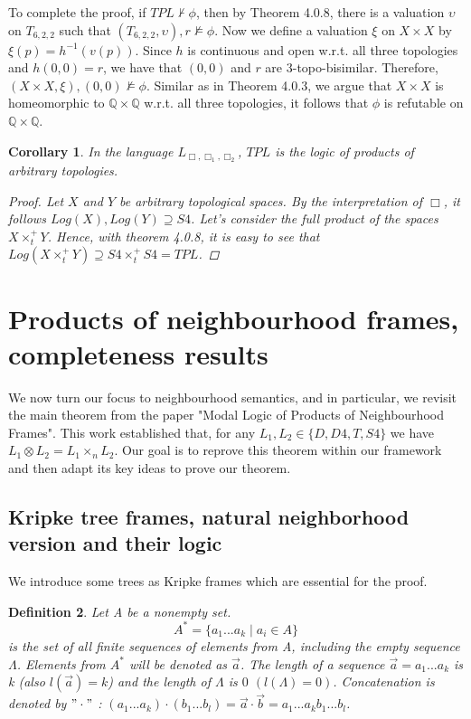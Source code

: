 \documentclass[12pt, a4paper]{scrartcl}
\newtheorem{definition}{Definition}[subsection]
\newtheorem{corollary}[definition]{Corollary}
\begin{document}
To complete the proof, if $\mathit{TPL} \nvdash \phi$, then by Theorem 4.0.8, there is a 
valuation $\upsilon$ on $T_{6,2,2}$ such that $(T_{6,2,2}, \upsilon), r \nvDash \phi$. Now we define a valuation $\xi$
on $X \times X$ by $\xi(p) = h^{-1}(v(p))$. Since $h$ is continuous and open w.r.t. all three topologies and $h(0,0) = r$,
we have that $(0,0)$ and $r$ are 3-topo-bisimilar. Therefore, $(X \times X, \xi),(0,0) \nvDash \phi$. Similar as in Theorem 4.0.3, we argue
that $X \times X$ is homeomorphic to $\mathbb{Q} \times \mathbb{Q}$ w.r.t. all three topologies, it follows that $\phi$ is refutable on $\mathbb{Q} \times \mathbb{Q}$.

\begin{corollary}
    In the language $L_{\Box, \Box_1, \Box_2}$, $\mathit{TPL}$ is the logic of products of arbitrary topologies.
    \begin{proof}
        Let $X$ and $Y$ be arbitrary topological spaces. By the interpretation of $\Box$, it follows
        $Log(X), Log(Y) \supseteq S4$. Let's consider the full product of the spaces $X \times^+_t Y$.
        Hence, with theorem 4.0.8, it is easy to see that $Log(X \times^+_t Y) \supseteq S4 \times^+_t S4 = \mathit{TPL}$.

    \end{proof}

\end{corollary}



\section{Products of neighbourhood frames, completeness results}
We now turn our focus to neighbourhood semantics, and in particular, we revisit the main theorem from the paper "Modal Logic of Products of Neighbourhood Frames". This work established that, for any $L_1, L_2 \in \{D,D4,T,S4\}$ we have
$L_1 \otimes L_2 = L_1 \times_n L_2$.
Our goal is to reprove this theorem within our framework and then adapt its key ideas to prove our theorem.

\subsection{Kripke tree frames, natural neighborhood version and their logic}
We introduce some trees as Kripke frames which are essential for the proof.

\begin{definition}
    Let A be a nonempty set.
    $$A^* = \{a_1...a_k \mid a_i \in A\}$$ 
    is the set of all finite sequences of elements from A, including the empty sequence $\Lambda$.
    Elements from $A^*$ will be denoted as $\vec{a}$. The length of a sequence $\vec{a} = a_1...a_k$ is k (also $l(\vec{a}) = k$) 
    and the length of $\Lambda$ is $0$ $(l(\Lambda) = 0)$. Concatenation is denoted by $"\cdot"$ : $(a_1...a_k) \cdot (b_1...b_l) = \vec{a} \cdot \vec{b} = a_1...a_kb_1...b_l$.

\end{definition}
\end{document}
